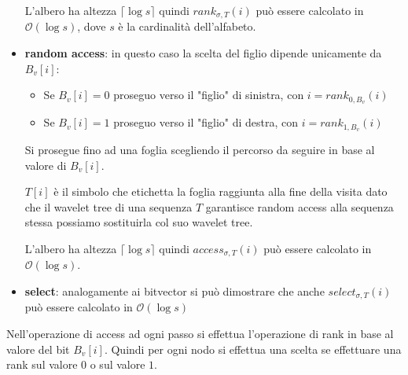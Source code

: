 \begin{itemize}
          L'albero ha altezza $\lceil \log s\rceil$ quindi $rank_{\sigma,T} (i)$
          può essere calcolato in $\mathcal{O}(\log s)$, dove $s$ è la cardinalità
          dell'alfabeto.
    \item \textbf{random access}: in questo caso la scelta del figlio dipende
          unicamente da $B_v [i]$:
          \begin{itemize}
              \item Se $B_v [i] = 0$ proseguo verso il "figlio" di sinistra,
                    con $i = rank_{0,B_v}(i)$
              \item Se $B_v [i] = 1$ proseguo verso il "figlio" di destra,
                    con $i = rank_{1,B_v}(i)$
          \end{itemize}
          Si prosegue fino ad una foglia scegliendo il percorso da seguire in
          base al valore di $B_v [i]$.

          $T[i]$ è il simbolo che etichetta la foglia raggiunta alla fine della
          visita dato che il wavelet tree di una sequenza $T$ garantisce random
          access alla sequenza stessa possiamo sostituirla col suo wavelet tree.

          L'albero ha altezza $\lceil\log s \rceil$ quindi $access_{\sigma,T} (i)$
          può essere calcolato in $\mathcal{O}(\log s)$.
    \item \textbf{select}: analogamente ai bitvector si può dimostrare che anche
          $select_{\sigma,T}(i)$ può essere calcolato in $\mathcal{O}(\log s)$
\end{itemize}
\begin{nota}
    Nell'operazione di access ad ogni passo si effettua l'operazione di rank
    in base al valore del bit $B_v [i]$. Quindi per ogni nodo si effettua una
    scelta se effettuare una rank sul valore $0$ o sul valore $1$.
\end{nota}
